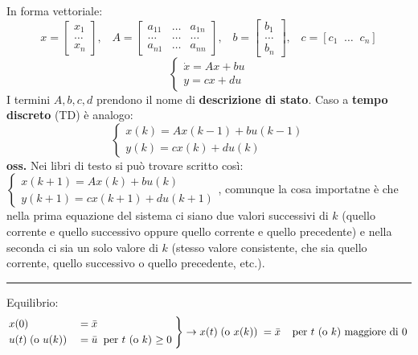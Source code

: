 In forma vettoriale:
\[
    x = \left[\begin{matrix}
        x_1\\
        \dots\\
        x_n
    \end{matrix}\right], \;\;\; A = \left[\begin{matrix}
        a_{11} & \dots & a_{1n}\\
        \dots & \dots & \dots\\
        a_{n1} & \dots & a_{nn}
    \end{matrix}\right], \;\;\; b = \left[\begin{matrix}
        b_1\\
        \dots\\
        b_n
    \end{matrix}\right], \;\;\; c = [c_1 \;\; \dots \;\; c_n]
\]
\[
    \begin{cases}
        \dot{x} = Ax+bu\\
        y = cx +du
    \end{cases}
\]
I termini $A, b, c, d$ prendono il nome di \textbf{descrizione di stato}.\newline
Caso a \textbf{tempo discreto} (TD) è analogo:
\[
    \begin{cases}
        x(k) = Ax(k-1) + bu(k-1)\\
        y(k) = cx(k) +d u(k)
    \end{cases}
\] 
\textbf{oss.} Nei libri di testo si può trovare scritto così: $\begin{cases}
    x(k+1) = Ax(k) + bu(k)\\
    y(k+1) = cx(k+1) +d u(k+1)
\end{cases}$, comunque la cosa importatne è che nella prima equazione del sistema ci siano due valori successivi di $k$ (quello corrente e quello successivo oppure quello corrente e quello precedente) e nella seconda ci sia un solo valore di $k$ (stesso valore consistente, che sia quello corrente, quello successivo o quello precedente, etc.).\newline
\rule{\textwidth}{0,4pt}\newline
\newline
Equilibrio:
\[
    \begin{rcases}
        x(0) &= \bar{x}\\
        u(t) \;\text{(o $u(k)$)}\; &= \bar{u} \;\;\text{per $t$ (o $k$) $\geq 0$}\;
    \end{rcases} \rightarrow x(t) \;\text{(o $x(k)$)}\; = \bar{x} \;\;\;\;\text{per $t$ (o $k$) maggiore di 0}\;
\]
